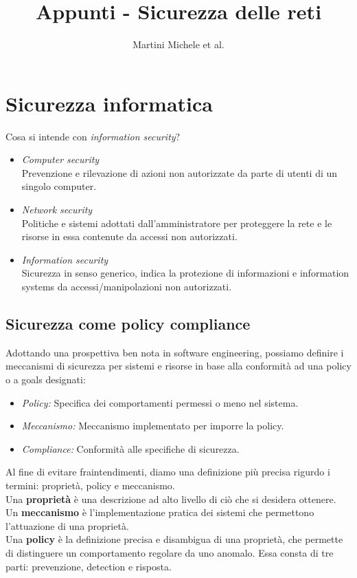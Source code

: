\documentclass[a4paper, 11pt, notitlepage, fleqn]{report}
\title{Appunti - Sicurezza delle reti}
\author{Martini Michele {\footnotesize et al.}}
\begin{document}
\maketitle

\setcounter{tocdepth}{1}
\tableofcontents

\chapter{Sicurezza informatica}
Cosa si intende con \emph{information security}?
\begin{itemize}
	\item \emph{Computer security}\\
	Prevenzione e rilevazione di azioni non autorizzate da parte di utenti di un singolo computer.
	\item \emph{Network security}\\
	Politiche e sistemi adottati dall'amministratore per proteggere la rete e le risorse in essa contenute da accessi non autorizzati.
	\item \emph{Information security}\\
	Sicurezza in senso generico, indica la protezione di informazioni e information systems da accessi/manipolazioni non autorizzati.
\end{itemize}

\section{Sicurezza come policy compliance}
Adottando una prospettiva ben nota in software engineering, possiamo definire i meccanismi di sicurezza per sistemi e risorse in base alla conformità ad una policy o a goals designati:
\begin{itemize}[itemsep=0pt, topsep=6pt]
	\item \emph{Policy:} Specifica dei comportamenti permessi o meno nel sistema.
	\item \emph{Meccanismo:} Meccanismo implementato per imporre la policy.
	\item \emph{Compliance:} Conformità alle specifiche di sicurezza.
\end{itemize}
Al fine di evitare fraintendimenti, diamo una definizione più precisa rigurdo i termini: proprietà, policy e meccanismo.\\
Una \textbf{proprietà} è una descrizione ad alto livello di ciò che si desidera ottenere.\\
Un \textbf{meccanismo} è l'implementazione pratica dei sistemi che permettono l'attuazione di una proprietà.\\
Una \textbf{policy} è la definizione precisa e disambigua di una proprietà, che permette di distinguere un comportamento regolare da uno anomalo. Essa consta di tre parti: prevenzione, detection e risposta.
\end{document}
